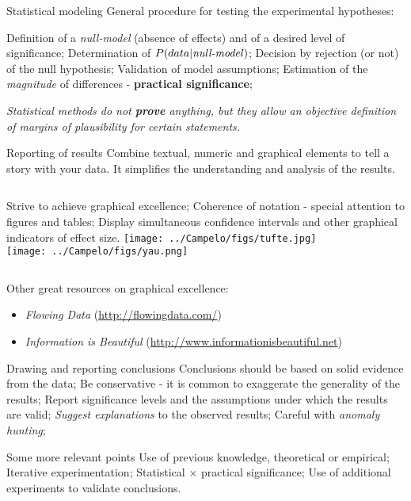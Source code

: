 
\begin{frame}{Statistical modeling}
\bitems General procedure for testing the experimental hypotheses:

	\bitems Definition of a \textit{null-model} (absence of effects) and of a desired level of significance;
		\spitem Determination of $P(data|\mbox{\textit{null-model}})$;
		\spitem Decision by rejection (or not) of the null hypothesis;
		\spitem Validation of model assumptions;
		\spitem Estimation of the  \textit{magnitude} of differences - \textbf{practical significance};
	\eitem
\eitem

	\centering\textit{Statistical methods do not \textbf{prove} anything, but they allow an objective definition of margins of plausibility for certain statements.}
\end{frame}


\begin{frame}{Reporting of results}
Combine textual, numeric and graphical elements to tell a story with your data. It simplifies the understanding and analysis of the results.
\begin{columns}[T]
	\bitems Strive to achieve graphical excellence;
		\spitem Coherence of notation - special attention to figures and tables;
		\spitem Display simultaneous confidence intervals and other graphical indicators of effect size.
	\eitem
{}
	\centering\texttt{[image: ../Campelo/figs/tufte.jpg]}\\
	\centering\texttt{[image: ../Campelo/figs/yau.png]}
\end{columns}
\vspace{1ex}
{\footnotesize
Other great resources on graphical excellence:
\begin{itemize}
\item\textit{Flowing Data} (\url{http://flowingdata.com/})
\item\textit{Information is Beautiful} (\url{http://www.informationisbeautiful.net})
\end{itemize}
}
\end{frame}

\begin{frame}{Drawing and reporting conclusions}
\bitems Conclusions should be based on solid evidence from the data;
	\spitem Be conservative - it is common to exaggerate the generality of the results;
	\spitem Report significance levels and the assumptions under which the results are valid;
	\spitem \textit{Suggest explanations} to the observed results;
	\spitem Careful with \textit{anomaly hunting};
\eitem
\end{frame}

\begin{frame}{Some more relevant points}
\bitems Use of previous knowledge, theoretical or empirical;
	\spitem Iterative experimentation;
	\spitem Statistical $\times$ practical significance;
	\spitem Use of additional experiments to validate conclusions.
\eitem
\end{frame}
